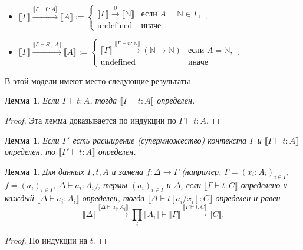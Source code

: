 \documentclass[openany]{book}
\theoremstyle{plain}
\newtheorem{lem}[thm]{Лемма}
\theoremstyle{definition}
\newcommand{\N}{\mathbb{N}}
\begin{document}
\begin{itemize}
    \item \(\llbracket \Gamma \rrbracket \overset{\llbracket \Gamma \vdash 0 : A \rrbracket}{\longrightarrow} \llbracket A \rrbracket := \begin{cases}\llbracket \Gamma \rrbracket \overset{0}{\longrightarrow} \llbracket \N \rrbracket & \text{если }A=\N \in \Gamma,\\ \text{undefined} & \text{иначе}\end{cases}.\)

    \item \(\llbracket \Gamma \rrbracket \overset{\llbracket \Gamma \vdash S_n : A \rrbracket}{\longrightarrow} \llbracket A \rrbracket := \begin{cases}\llbracket \Gamma \rrbracket \overset{\llbracket \Gamma \vdash n : \N \rrbracket}{\longrightarrow} (\N \to \N) & \text{если }A = \N,\\ \text{undefined} & \text{иначе}\end{cases}.\)
\end{itemize}

В этой модели имеют место следующие результаты
\begin{lem}
Если \(\Gamma \vdash t : A\), тогда \(\llbracket \Gamma \vdash t : A \rrbracket\) определен.
\end{lem}
\begin{proof}
Эта лемма доказывается по индукции по \(\Gamma \vdash t : A\).
\end{proof}

\begin{lem}
Если \(\Gamma'\)  есть расширение (супермножество) контекста \(\Gamma\) и \(\llbracket \Gamma \vdash t : A \rrbracket\) определен, то \(\llbracket \Gamma' \vdash t : A \rrbracket\) определен.
\end{lem}

\begin{lem}
Для данных \(\Gamma, t, A\) и замена \(f : \Delta \to \Gamma\) (например, \(\Gamma = (x_i : A_i)_{i \in I}\), \(f = (a_i)_{i \in I}\), \(\Delta \vdash a_i : A_i\)), термы \((a_i)_{i \in I}\) и \(\Delta\), если \(\llbracket \Gamma \vdash t : C \rrbracket\) определено и каждый \(\llbracket \Delta \vdash a_i : A_i \rrbracket\) определен, тогда \(\llbracket \Delta \vdash t[a_i/x_i] : C \rrbracket\) определен и равен \[\llbracket \Delta \rrbracket \overset{\llbracket \Delta \vdash a_i : A_i \rrbracket}{\longrightarrow} \prod_i \llbracket A_i \rrbracket \vdash \llbracket \Gamma \rrbracket \overset{\llbracket \Gamma \vdash t : C \rrbracket}{\longrightarrow} \llbracket C \rrbracket.\]
\end{lem}
\begin{proof}
По индукции на \(t\).
\end{proof}
\end{document}
